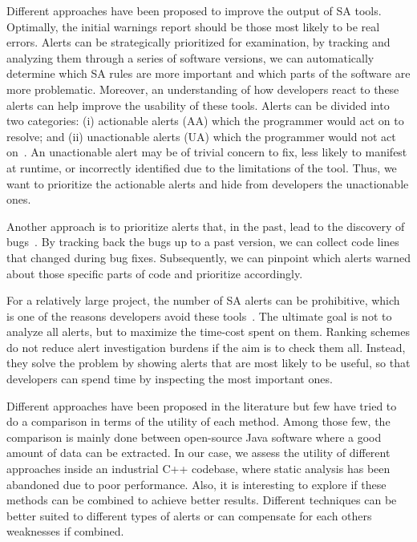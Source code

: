 Different approaches have been proposed to improve the output of SA tools. Optimally, the initial warnings report should be those most likely to be real errors. Alerts can be strategically prioritized for examination, by tracking and analyzing them through a series of software versions, we can automatically determine which SA rules are more important and which parts of the software are more problematic. 
Moreover, an understanding of how developers react to these alerts can help improve the usability of these tools. Alerts can be divided into two categories: (i) actionable alerts (AA) which the programmer would act on to resolve; and (ii) unactionable alerts (UA) which the programmer would not act on~\cite{comparative_heckman, actionable_sa}. An unactionable alert may be of trivial concern to fix, less likely to manifest at runtime, or incorrectly identified due to the limitations of the tool. Thus, we want to prioritize the actionable alerts and hide from developers the unactionable ones.

Another approach is to prioritize alerts that, in the past, lead to the discovery of bugs~\cite{which_warnings,automatic_training_set}. By tracking back the bugs up to a past version, we can collect code lines that changed during bug fixes. Subsequently, we can pinpoint which alerts warned about those specific parts of code and prioritize accordingly.

For a relatively large project, the number of SA alerts can be prohibitive, which is one of the reasons developers avoid these tools~\cite{why_dont_use}. The ultimate goal is not to analyze all alerts, but to maximize the time-cost spent on them. Ranking schemes do not reduce alert investigation burdens if the aim is to check them all. Instead, they solve the problem by showing alerts that are most likely to be useful, so that developers can spend time by inspecting the most important ones.

Different approaches have been proposed in the literature but few have tried to do a comparison in terms of the utility of each method. Among those few, the comparison is mainly done between open-source Java software where a good amount of data can be extracted. In our case, we assess the utility of different approaches inside an industrial C++ codebase, where static analysis has been abandoned due to poor performance. Also, it is interesting to explore if these methods can be combined to achieve better results. Different techniques can be better suited to different types of alerts or can compensate for each others weaknesses if combined.

